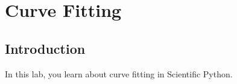 \chapter{Curve Fitting}

\section{Introduction}

In this lab, you learn about curve fitting in Scientific Python.




















